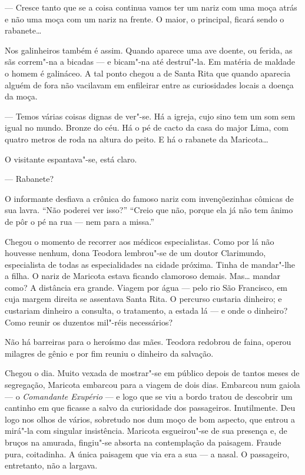 --- Cresce tanto que se a coisa continua vamos ter um nariz com uma moça
atrás e não uma moça com um nariz na frente. O maior, o principal,
ficará sendo o rabanete\ldots{}

Nos galinheiros também é assim. Quando aparece uma ave doente, ou
ferida, as sãs correm"-na a bicadas --- e bicam"-na até destruí"-la. Em
matéria de maldade o homem é galináceo. A tal ponto chegou a de Santa
Rita que quando aparecia alguém de fora não vacilavam em enfileirar
entre as curiosidades locais a doença da moça.

--- Temos várias coisas dignas de ver"-se. Há a igreja, cujo sino tem um
som sem igual no mundo. Bronze do céu. Há o pé de cacto da casa do major
Lima, com quatro metros de roda na altura do peito. E há o rabanete da
Maricota\ldots{}

O visitante espantava"-se, está claro.

--- Rabanete?

O informante desfiava a crônica do famoso nariz com invençõezinhas
cômicas de sua lavra. ``Não poderei ver isso?'' ``Creio que não, porque
ela já não tem ânimo de pôr o pé na rua --- nem para a missa.''

Chegou o momento de recorrer aos médicos especialistas. Como por lá não
houvesse nenhum, dona Teodora lembrou"-se de um doutor Clarimundo,
especialista de todas as especialidades na cidade próxima. Tinha de
mandar"-lhe a filha. O nariz de Maricota estava ficando clamoroso demais.
Mas\ldots{} mandar como? A distância era grande. Viagem por água --- pelo rio
São Francisco, em cuja margem direita se assentava Santa Rita. O
percurso custaria dinheiro; e custariam dinheiro a consulta, o
tratamento, a estada lá --- e onde o dinheiro? Como reunir os duzentos
mil"-réis necessários?

Não há barreiras para o heroísmo das mães. Teodora redobrou de faina,
operou milagres de gênio e por fim reuniu o dinheiro da salvação.

Chegou o dia. Muito vexada de mostrar"-se em público depois de tantos
meses de segregação, Maricota embarcou para a viagem de dois dias.
Embarcou num gaiola --- o \emph{Comandante Exupério} --- e logo que se
viu a bordo tratou de descobrir um cantinho em que ficasse a salvo da
curiosidade dos passageiros. Inutilmente. Deu logo nos olhos de vários,
sobretudo nos dum moço de bom aspecto, que entrou a mirá"-la com singular
insistência. Maricota esgueirou"-se de sua presença e, de bruços na
amurada, fingiu"-se absorta na contemplação da paisagem. Fraude pura,
coitadinha. A única paisagem que via era a sua --- a nasal. O
passageiro, entretanto, não a largava.

